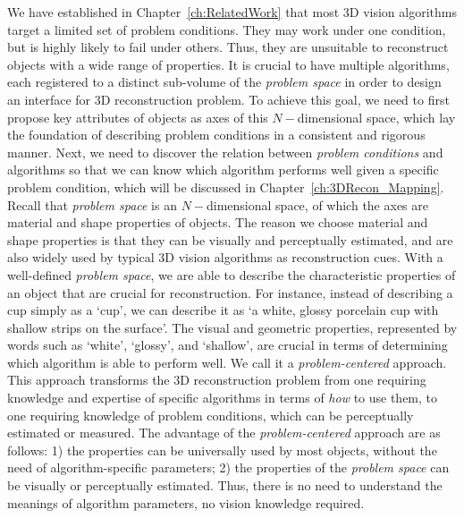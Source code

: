 We have established in Chapter~\ref{ch:RelatedWork} that most 3D vision algorithms target a limited set of problem conditions. They may work under one condition, but is highly likely to fail under others. Thus, they are unsuitable to reconstruct objects with a wide range of properties. It is crucial to have multiple algorithms, each registered to a distinct sub-volume of the \textit{problem space} in order to design an interface for 3D reconstruction problem. To achieve this goal, we need to first propose key attributes of objects as axes of this $N-$dimensional space, which lay the foundation of describing problem conditions in a consistent and rigorous manner. Next, we need to discover the relation between \textit{problem conditions} and algorithms so that we can know which algorithm performs well given a specific problem condition, which will be discussed in Chapter~\ref{ch:3DRecon_Mapping}. Recall that \textit{problem space} is an $N-$dimensional space, of which the axes are material and shape properties of objects. The reason we choose material and shape properties is that they can be visually and perceptually estimated, and are also widely used by typical 3D vision algorithms as reconstruction cues. With a well-defined \textit{problem space}, we are able to describe the characteristic properties of an object that are crucial for reconstruction. For instance, instead of describing a cup simply as a `cup', we can describe it as `a white, glossy porcelain cup with shallow strips on the surface'. The visual and geometric properties, represented by words such as `white', `glossy', and `shallow', are crucial in terms of determining which algorithm is able to perform well. We call it a \textit{problem-centered} approach. This approach transforms the 3D reconstruction problem from one requiring knowledge and expertise of specific algorithms in terms of \textit{how} to use them, to one requiring knowledge of problem conditions, which can be perceptually estimated or measured. The advantage of the \textit{problem-centered} approach are as follows: 1) the properties can be universally used by most objects, without the need of algorithm-specific parameters; 2) the properties of the \textit{problem space} can be visually or perceptually estimated. Thus, there is no need to understand the meanings of algorithm parameters, \ie no vision knowledge required.


